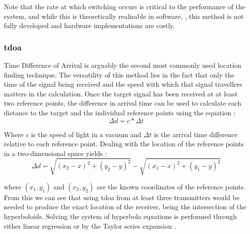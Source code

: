 \documentclass[class=report,11pt,crop=false]{standalone}
\begin{document}
Note that the rate at which switching occurs is critical to the performance of the system, and while this is theoretically realisable in software,  \cite{pd-gnu}, this method is not fully developed and hardware implementations are costly.



\subsubsection{\gls{tdoa}}
Time Difference of Arrival is arguably the second most commonly used location finding technique. The versatility of this method lies in the fact that only the time of the signal being received and the speed with which that signal travellers matters in the calculation. Once the target signal has been received at at least two reference points, the difference in arrival time can be used to calculate each distance to the target and the individual reference points using the equation \cite{tdoa-formula}:
\begin{equation}
    \Delta d = c * \Delta t  
    \label{eq:distance}
\end{equation}

Where \emph{c} is the speed of light in a vacuum and $\Delta t $ is the arrival time difference relative to each reference point. Dealing with the location of the reference points in a two-dimensional space yields \cite{tdao-2d}:
\begin{equation}
    \Delta d = \sqrt{(x_2 - x)^2 + (y_2 - y) ^2} - \sqrt{(x_1 - x)^2 + (y_1 - y)^2}
\end{equation}

where $(x_1, y_1)$ and $(x_2, y_2)$ are the known coordinates of the reference points. From this we can see that using \gls{tdoa} from at least three transmitters would be needed to produce the exact location of the receiver, being the intersection of the hyperboloids. Solving the system of hyperbola equations is performed through either linear regression or by the Taylor series expansion \cite{tdao-2d}.
\end{document}
